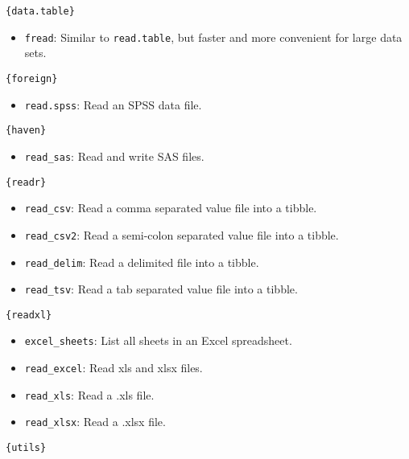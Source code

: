 \documentclass[]{book}
\providecommand{\tightlist}{%
  \setlength{\itemsep}{0pt}\setlength{\parskip}{0pt}}
\begin{document}
\texttt{\{data.table\}}

\begin{itemize}
\tightlist
\item
  \texttt{fread}: Similar to \texttt{read.table}, but faster and more convenient for large data sets.
\end{itemize}

\texttt{\{foreign\}}

\begin{itemize}
\tightlist
\item
  \texttt{read.spss}: Read an SPSS data file.
\end{itemize}

\texttt{\{haven\}}

\begin{itemize}
\tightlist
\item
  \texttt{read\_sas}: Read and write SAS files.
\end{itemize}

\texttt{\{readr\}}

\begin{itemize}
\tightlist
\item
  \texttt{read\_csv}: Read a comma separated value file into a tibble.
\item
  \texttt{read\_csv2}: Read a semi-colon separated value file into a tibble.
\item
  \texttt{read\_delim}: Read a delimited file into a tibble.
\item
  \texttt{read\_tsv}: Read a tab separated value file into a tibble.
\end{itemize}

\texttt{\{readxl\}}

\begin{itemize}
\tightlist
\item
  \texttt{excel\_sheets}: List all sheets in an Excel spreadsheet.
\item
  \texttt{read\_excel}: Read xls and xlsx files.
\item
  \texttt{read\_xls}: Read a .xls file.
\item
  \texttt{read\_xlsx}: Read a .xlsx file.
\end{itemize}

\texttt{\{utils\}}
\end{document}
